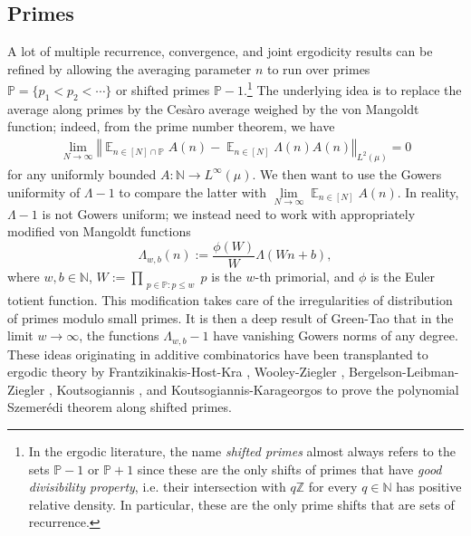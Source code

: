 \documentclass[11pt]{amsart}
\theoremstyle{definition}
\DeclareMathOperator*{\E}{\mathbb{E}}
\newcommand{\N}{{\mathbb N}}
\renewcommand{\P}{{\mathbb P}}
\newcommand{\Z}{{\mathbb Z}}
\newcommand{\norm}[1]{\left\Vert #1\right\Vert}
\newcommand{\1}{{\mathbf{1}}}
\begin{document}
    \subsection{Primes}
    A lot of multiple recurrence, convergence, and joint ergodicity results can be refined by allowing the averaging parameter $n$ to run over primes $\P=\{p_1<p_2<\cdots\}$ or shifted primes $\P-1$.\footnote{In the ergodic literature, the name \emph{shifted primes} almost always refers to the sets $\P-1$ or $\P+1$ since these are the only shifts of primes that have \emph{good divisibility property}, i.e. their intersection with $q\Z$ for every $q\in\N$ has positive relative density. In particular, these are the only prime shifts that are sets of recurrence.}
     The underlying idea is to replace the average along primes by the Ces\`aro average weighed by the von Mangoldt function; indeed, from the prime number theorem, we have
    \begin{align*}
        \lim_{N\to\infty}\norm{\E_{n\in[N]\cap \P}A(n)-\E_{n\in[N]}\Lambda(n) A(n)}_{L^2(\mu)} = 0
    \end{align*}
    for any uniformly bounded $A:\N\to L^\infty(\mu)$. We then want to use the Gowers uniformity of $\Lambda-1$ to compare the latter with $\lim\limits_{N\to\infty}\E_{n\in[N]}A(n)$. In reality, $\Lambda-1$ is not Gowers uniform; we instead need to work with appropriately modified von Mangoldt functions $$\Lambda_{w,b}(n) := \frac{\phi(W)}{W}\Lambda(Wn+b),$$ where $w,b\in\N$, $W :=\prod\limits_{\substack{p\in\P\colon p\leq w}}p$ is the $w$-th primorial, and $\phi$ is the Euler totient function. This modification takes care of the irregularities of distribution of primes modulo small primes. It is then a deep result of Green-Tao \cite{GT08b, GT10b, GT12b} that in the limit $w\to\infty$, the functions $\Lambda_{w,b}-1$ have vanishing Gowers norms of any degree. These ideas originating in additive combinatorics have been transplanted to ergodic theory by Frantzikinakis-Host-Kra \cite{FHK07, FHK10}, Wooley-Ziegler \cite{WZ12}, Bergelson-Leibman-Ziegler \cite{BLZ08}, Koutsogiannis \cite{Ko18b}, and Koutsogiannis-Karageorgos \cite{KK19} to prove the polynomial Szemer\'edi theorem along shifted primes.
    
    
\end{document}
